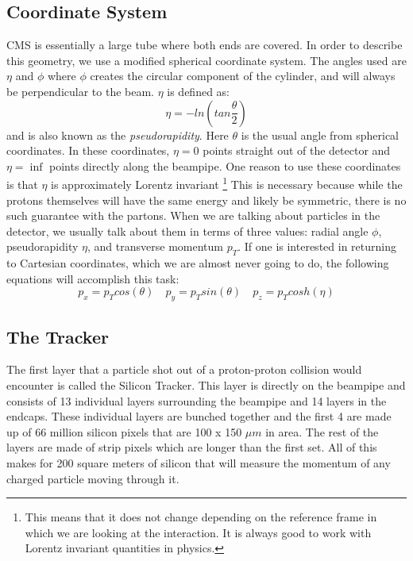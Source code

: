 \subsection{Coordinate System}
CMS is essentially a large tube where both ends are covered. In order to describe this geometry, we use a modified spherical coordinate system.
The angles used are $\eta$ and $\phi$ where $\phi$ creates the circular component of the cylinder, and will always be perpendicular to the beam.
$\eta$ is defined as:
\begin{equation}
   \eta = -ln  \left( tan \frac{\theta}{2} \right)
\end{equation} 
and is also known as the \textit{pseudorapidity}. Here $\theta$ is the usual angle from spherical coordinates. 
In these coordinates, $\eta = 0$ points straight out of the detector and $\eta = \inf$ points directly along the beampipe.
One reason to use these coordinates is that $\eta$ is approximately Lorentz invariant \footnote{This means that it does not change depending on the reference frame in which we are looking at the interaction. It is always good to work with Lorentz invariant quantities in physics.}
This is necessary because while the protons themselves will have the same energy and likely be symmetric, there is no such guarantee with the partons. 
When we are talking about particles in the detector, we usually talk about them in terms of three values: radial angle $\phi$, pseudorapidity $\eta$, and transverse momentum $p_T$.
If one is interested in returning to Cartesian coordinates, which we are almost never going to do, the following equations will accomplish this task:
\begin{equation}
   p_x = p_T cos(\theta) \quad p_y = p_T sin(\theta) \quad p_z = p_T cosh(\eta)
\end{equation}

\subsection{The Tracker}
The first layer that a particle shot out of a proton-proton collision would encounter is called the Silicon Tracker. 
This layer is directly on the beampipe and consists of 13 individual layers surrounding the beampipe and 14 layers in the endcaps.
These individual layers are bunched together and the first 4 are made up of 66 million silicon pixels that are 100 x 150 $\mu m$ in area. The rest of the layers are made of strip pixels which are longer than the first set.
All of this makes for 200 square meters of silicon that will measure the momentum of any charged particle moving through it.

